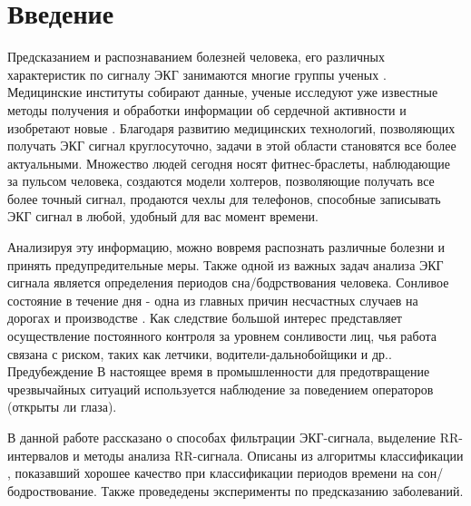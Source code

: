 \chapter{Введение}

Предсказанием и распознаванием болезней человека, его различных характеристик по сигналу ЭКГ занимаются многие группы ученых \cite{about_ekg_sciense1, about_ekg_sciense2}. Медицинские институты собирают данные, ученые исследуют уже известные методы получения и обработки информации об сердечной активности и изобретают новые \cite{get_ekg_signal}. Благодаря развитию медицинских технологий, позволяющих получать ЭКГ сигнал круглосуточно, задачи в этой области становятся все более актуальными. Множество людей сегодня носят фитнес-браслеты, наблюдающие за пульсом человека, создаются модели холтеров, позволяющие получать все более точный сигнал, продаются чехлы для телефонов, способные записывать ЭКГ сигнал в любой, удобный для вас момент времени.

Анализируя эту информацию, можно вовремя распознать различные болезни и принять предупредительные меры. Также одной из важных задач анализа ЭКГ сигнала является определения периодов сна/бодрствования человека. Сонливое состояние в течение дня - одна из главных причин несчастных случаев на дорогах и производстве \cite{accidents}. Как следствие большой интерес представляет осуществление постоянного контроля за уровнем сонливости лиц, чья работа связана с риском, таких как летчики, водители-дальнобойщики и др.. Предубеждение В настоящее время в промышленности для предотвращение чрезвычайных ситуаций используется наблюдение за поведением операторов (открыты ли глаза). 

В данной работе рассказано о способах фильтрации ЭКГ-сигнала, выделение RR-интервалов и методы анализа RR-сигнала. Описаны из алгоритмы классификации , показавший хорошее качество при классификации периодов времени на сон/бодроствование. Также проведедены эксперименты по предсказанию заболеваний.